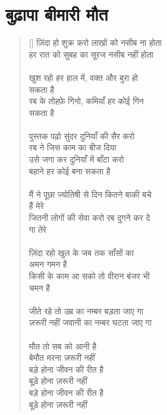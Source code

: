 \chapter{\texthindi{
बुढ़ापा बीमारी मौत
}} 

\begin{verse}[\versewidth]\texthindi{
ज़िंदा हो शुक्र करो लाखों को नसीब ना होता \\
हर रात को सुबह का सूरज नसीब नहीं होता\\
\\
खुश रहो हर हाल में, वक्त और बुरा हो\\
सकता है\\
रब के तोहफ़े गिनो, कमियाँ हर कोई गिन\\
सकता है \\
\\
पुस्तक पढ़ो सुंदर दुनियाँ की सैर करो \\
रब ने जिस काम का बीज दिया \\
उसे जगा कर दुनियाँ में बाँटा करो \\
बहाने हर कोई बना सकता है \\
\\
मैं ने पूछा ज्योतिषी से दिन कितने बाकी बचे\\
हैं मेरे\\
जितनी लोगों की सेवा करो रब दुगने कर दे\\
गा तेरे\\
\\
ज़िंदा रहो खुल के जब तक साँसों का \\
अमन गमन है \\
किसी के काम आ सको तो वीरान बंजर भी \\
चमन है \\
\\
जीते रहे तो उम्र का नम्बर बड़ता जाए गा\\
ज़रूरी नहीं जवानी का नम्बर घटता जाए गा\\
\\
मौत तो सब को आनी है\\
बेमौत मरना ज़रूरी नहीं\\
बड़े होना जीवन की रीत है\\
बूड़े होना ज़रूरी नहीं\\
बड़े होना जीवन की रीत है\\
बूड़े होना ज़रूरी नहीं
}\end{verse}

